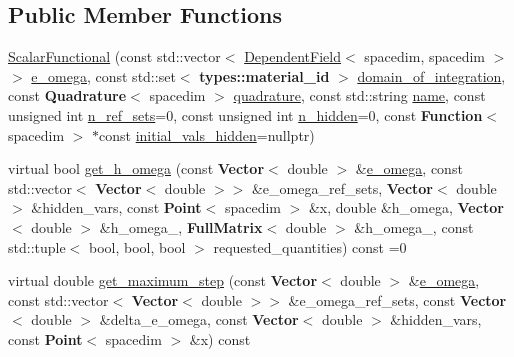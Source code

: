 \subsection*{Public Member Functions}
\begin{DoxyCompactItemize}
\item 
\hyperlink{class_scalar_functional_3_01spacedim_00_01spacedim_01_4_a4c4903b402908f26b8c8b433a7cbeb76}{Scalar\+Functional} (const std\+::vector$<$ \hyperlink{class_dependent_field}{Dependent\+Field}$<$ spacedim, spacedim $>$$>$ \hyperlink{class_scalar_functional_3_01spacedim_00_01spacedim_01_4_adfed9b70b743ba245a39c3e63b951f96}{e\+\_\+omega}, const std\+::set$<$ {\bf types\+::material\+\_\+id} $>$ \hyperlink{class_scalar_functional_3_01spacedim_00_01spacedim_01_4_aa192395f822a64f60df43bf9d36c2f3a}{domain\+\_\+of\+\_\+integration}, const {\bf Quadrature}$<$ spacedim $>$ \hyperlink{class_scalar_functional_3_01spacedim_00_01spacedim_01_4_ab83ee3ae077b211137824b006098382e}{quadrature}, const std\+::string \hyperlink{class_scalar_functional_3_01spacedim_00_01spacedim_01_4_a195248af3821548af3000872e9e6d00e}{name}, const unsigned int \hyperlink{class_scalar_functional_3_01spacedim_00_01spacedim_01_4_acee2c3c289e5b2b680996facc2f79e78}{n\+\_\+ref\+\_\+sets}=0, const unsigned int \hyperlink{class_scalar_functional_3_01spacedim_00_01spacedim_01_4_a7df6711471715f907bc9911449c5c825}{n\+\_\+hidden}=0, const {\bf Function}$<$ spacedim $>$ $\ast$const \hyperlink{class_scalar_functional_3_01spacedim_00_01spacedim_01_4_ae3282d5182360e0030e4cc5e02fbe2eb}{initial\+\_\+vals\+\_\+hidden}=nullptr)
\item 
virtual bool \hyperlink{class_scalar_functional_3_01spacedim_00_01spacedim_01_4_a629bfeae4d8ea364fc3f72fea8016ac8}{get\+\_\+h\+\_\+omega} (const {\bf Vector}$<$ double $>$ \&\hyperlink{class_scalar_functional_3_01spacedim_00_01spacedim_01_4_adfed9b70b743ba245a39c3e63b951f96}{e\+\_\+omega}, const std\+::vector$<$ {\bf Vector}$<$ double $>$$>$ \&e\+\_\+omega\+\_\+ref\+\_\+sets, {\bf Vector}$<$ double $>$ \&hidden\+\_\+vars, const {\bf Point}$<$ spacedim $>$ \&x, double \&h\+\_\+omega, {\bf Vector}$<$ double $>$ \&h\+\_\+omega\+\_, {\bf Full\+Matrix}$<$ double $>$ \&h\+\_\+omega\+\_, const std\+::tuple$<$ bool, bool, bool $>$ requested\+\_\+quantities) const =0
\item 
virtual double \hyperlink{class_scalar_functional_3_01spacedim_00_01spacedim_01_4_aba0e5304e9786bf28a25483d467e5d70}{get\+\_\+maximum\+\_\+step} (const {\bf Vector}$<$ double $>$ \&\hyperlink{class_scalar_functional_3_01spacedim_00_01spacedim_01_4_adfed9b70b743ba245a39c3e63b951f96}{e\+\_\+omega}, const std\+::vector$<$ {\bf Vector}$<$ double $>$$>$ \&e\+\_\+omega\+\_\+ref\+\_\+sets, const {\bf Vector}$<$ double $>$ \&delta\+\_\+e\+\_\+omega, const {\bf Vector}$<$ double $>$ \&hidden\+\_\+vars, const {\bf Point}$<$ spacedim $>$ \&x) const 
$$
\end{DoxyCompactItemize}
